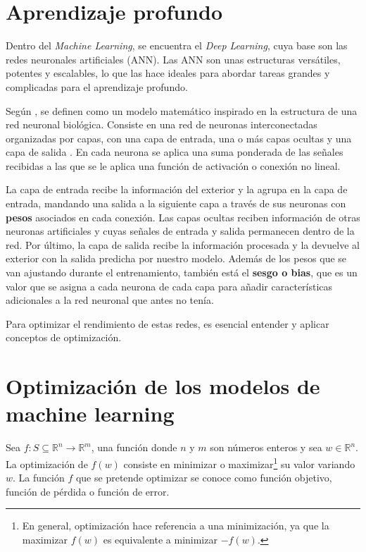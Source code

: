 \section{Aprendizaje profundo}

Dentro del \textit{Machine Learning}, se encuentra el\textit{ Deep Learning}, cuya base son las redes neuronales artificiales (ANN). Las ANN son unas estructuras versátiles, potentes y escalables, lo que las hace ideales para abordar tareas grandes y complicadas para el aprendizaje profundo. 

Según \citep{pajares2021aprendizaje}, se definen como un modelo matemático inspirado en la estructura de una red neuronal biológica. Consiste en una red de neuronas interconectadas organizadas por capas, con una capa de entrada, una o más capas ocultas y una capa de salida \citep{dolling2002artificial}. En cada neurona se aplica una suma ponderada de las señales recibidas a las que se le aplica una función de activación o conexión no lineal. 

La capa de entrada recibe la información del exterior y la agrupa en la capa de entrada, mandando una salida a la siguiente capa a través de sus neuronas con \textbf{pesos} asociados en cada conexión. Las capas ocultas reciben información de otras neuronas artificiales y cuyas señales de entrada y salida permanecen dentro de la red. Por último, la capa de salida recibe la información procesada y la devuelve al exterior con la salida predicha por nuestro modelo. Además de los pesos que se van ajustando durante el entrenamiento, también está el \textbf{sesgo o bias}, que es un valor que se asigna a cada neurona de cada capa para añadir características adicionales a la red neuronal que antes no tenía. 

Para optimizar el rendimiento de estas redes, es esencial entender y aplicar conceptos de optimización.


\section{Optimización de los modelos de machine learning} 

Sea $f: S \subseteq \mathbb{R}^n \to \mathbb{R}^m$, una función donde $n$ y $m$ son números enteros y sea $w \in \mathbb{R}^n$. La optimización de $f(w)$ consiste en minimizar o maximizar\footnote{En general, optimización hace referencia a una minimización, ya que la maximizar $f(w)$ es equivalente a minimizar $-f(w)$.} su valor variando $w$. La función $f$ que se pretende optimizar se conoce como función objetivo, función de pérdida o función de error. 

